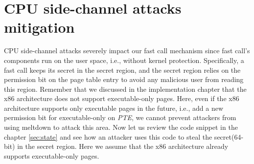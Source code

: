 \section{CPU side-channel attacks mitigation}

CPU side-channel attacks\cite{3,4} severely impact our fast call 
mechanism since fast call's components run on the user space, 
i.e., without kernel protection. Specifically, a fast call keeps its secret 
in the secret region, and the secret region relies on the permission bit on 
the page table entry to avoid any malicious user from reading this region. 
Remember that we discussed in the implementation chapter that the x86 architecture does not 
support executable-only pages.  Here, even if the x86 architecture supports 
only executable pages in the future, i.e., add a new permission bit for 
executable-only on \emph{PTE}\cite{25},  we cannot prevent attackers from using meltdown to 
attack this area. Now let us review the code snippet in the chapter \ref{sec:state} and see how an attacker uses this code to steal the secret(64-bit) in the 
secret region. Here we assume that the x86 architecture already supports 
executable-only pages.

